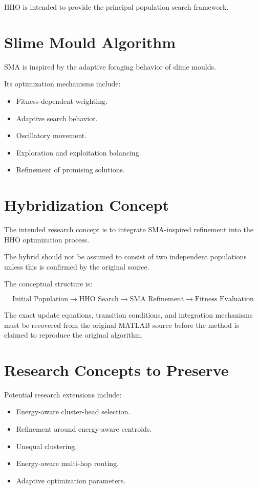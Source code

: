 \documentclass[12pt,a4paper]{report}
\begin{document}
HHO is intended to provide the principal population
search framework.

\section{Slime Mould Algorithm}

SMA is inspired by the adaptive foraging behavior
of slime moulds.

Its optimization mechanisms include:

\begin{itemize}
    \item Fitness-dependent weighting.
    \item Adaptive search behavior.
    \item Oscillatory movement.
    \item Exploration and exploitation balancing.
    \item Refinement of promising solutions.
\end{itemize}

\section{Hybridization Concept}

The intended research concept is to integrate
SMA-inspired refinement into the HHO optimization
process.

The hybrid should not be assumed to consist of two
independent populations unless this is confirmed by
the original source.

The conceptual structure is:

\begin{equation}
\text{Initial Population}
\longrightarrow
\text{HHO Search}
\longrightarrow
\text{SMA Refinement}
\longrightarrow
\text{Fitness Evaluation}
\end{equation}

The exact update equations, transition conditions,
and integration mechanisms must be recovered from
the original MATLAB source before the method is
claimed to reproduce the original algorithm.

\section{Research Concepts to Preserve}

Potential research extensions include:

\begin{itemize}
    \item Energy-aware cluster-head selection.
    \item Refinement around energy-aware centroids.
    \item Unequal clustering.
    \item Energy-aware multi-hop routing.
    \item Adaptive optimization parameters.
\end{itemize}
\end{document}
